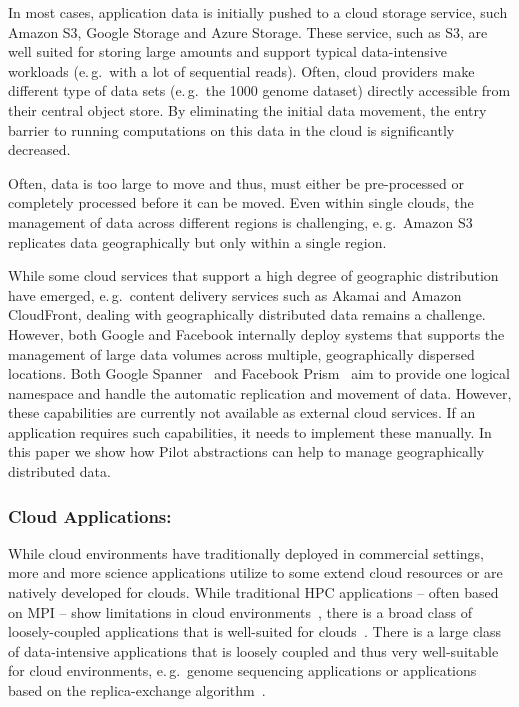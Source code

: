 \documentclass[times]{cpeauth}
\newcommand{\pilot}{Pilot\xspace}
\begin{document}
In most cases, application data is initially pushed to a cloud storage
service, such Amazon S3, Google Storage and Azure Storage. These service, such
as S3, are well suited for storing large amounts and support typical
data-intensive workloads (e.\,g.\ with a lot of sequential reads). Often,
cloud providers make different type of data sets (e.\,g.\ the 1000 genome
dataset) directly accessible from their central object store. By eliminating
the initial data movement, the entry barrier to running computations on this
data in the cloud is significantly decreased. 

Often, data is too large to move and thus, must either be
pre-processed or completely processed before it can be moved. Even within
single clouds, the management of data across different regions is challenging, 
e.\,g.\ Amazon S3  replicates data geographically but only within a single
region.

While some cloud services that support a high degree of geographic
distribution have emerged, e.\,g.\ content delivery services such as
Akamai and Amazon CloudFront, dealing with geographically distributed
data remains a challenge. However, both Google and Facebook internally
deploy systems that supports the management of large data volumes
across multiple, geographically dispersed locations. Both Google
Spanner~\cite{dean09} and Facebook Prism~\cite{Metz12} aim to provide
one logical namespace and handle the automatic replication and
movement of data. However, these capabilities are currently not
available as external cloud services. If an application requires such
capabilities, it needs to implement these manually. In this paper we
show how \pilot abstractions can help to manage geographically
distributed data.



\subsubsection*{Cloud Applications:}

While cloud environments have traditionally deployed in commercial settings,
more and more science applications utilize to some extend cloud resources or
are natively developed for clouds. While traditional HPC applications -- often
based on MPI -- show limitations in cloud
environments~\cite{Evangelinos2008,Mehrotra:2012:PEA:2287036.2287045}, there
is a broad class of loosely-coupled applications that is well-suited for
clouds~\cite{1851544,Sehgal2011590}. There is a large class of data-intensive
applications that is loosely coupled and thus very well-suitable for cloud
environments, e.\,g.\ genome sequencing applications or applications based on
the replica-exchange algorithm~\cite{bigjob_cloudcom10}.
\end{document}
